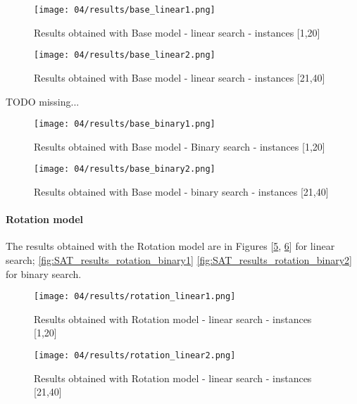   \begin{figure}[H]
    \centering
    \texttt{[image: 04/results/base\_linear1.png]}
    \caption{
      Results obtained with Base model - linear search - instances [1,20]
    }
    \label{fig:SAT_results_base_linear1}
  \end{figure}
  \begin{figure}[H]
    \centering
    \texttt{[image: 04/results/base\_linear2.png]}
    \caption{
      Results obtained with Base model - linear search - instances [21,40]
    }
    \label{fig:SAT_results_base_linear2}
  \end{figure}    

  \colorbox{BurntOrange}{TODO missing...} 
  \begin{figure}[H]
    \centering
    \texttt{[image: 04/results/base\_binary1.png]}
    \caption{
      Results obtained with Base model - Binary search - instances [1,20]
    }
    \label{fig:SAT_results_base_binary1}
  \end{figure}
  \begin{figure}[H]
    \centering
    \texttt{[image: 04/results/base\_binary2.png]}
    \caption{
      Results obtained with Base model - binary search - instances [21,40]
    }
    \label{fig:SAT_results_base_binary2}
  \end{figure} 
  

  \paragraph{Rotation model}
  The results obtained with the Rotation model are in Figures [\ref{fig:SAT_results_rotation_linear1}, \ref{fig:SAT_results_rotation_linear2}]
  for linear search; \ref{fig:SAT_results_rotation_binary1} \ref{fig:SAT_results_rotation_binary2} for binary search.
  
  \begin{figure}[H]
    \centering
    \texttt{[image: 04/results/rotation\_linear1.png]}
    \caption{
      Results obtained with Rotation model - linear search - instances [1,20]
    }
    \label{fig:SAT_results_rotation_linear1}
  \end{figure}

  \begin{figure}[H]
    \centering
    \texttt{[image: 04/results/rotation\_linear2.png]}
    \caption{
      Results obtained with Rotation model - linear search - instances [21,40]
    }
    \label{fig:SAT_results_rotation_linear2}
  \end{figure}    

